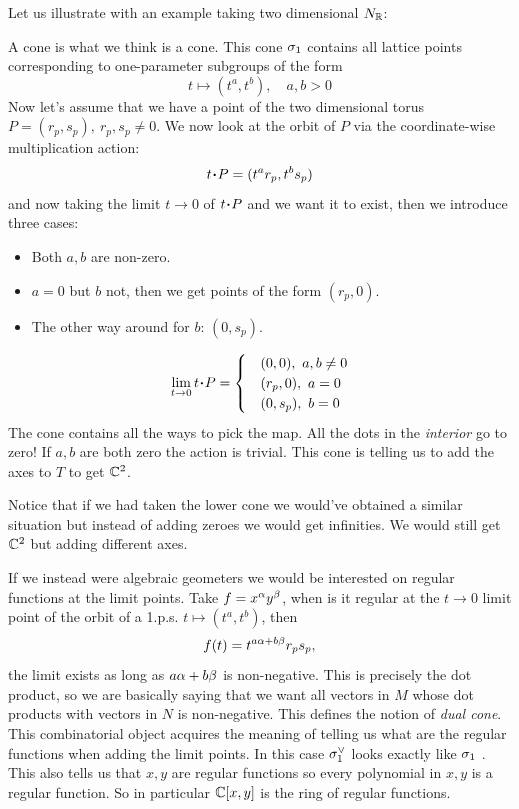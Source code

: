 \documentclass[12pt]{memoir}
\begin{document}
Let us illustrate with an example taking two dimensional $N_{\mathbb{R}}$:

\begin{Ex}
    A cone is what we think is a cone.
This cone $\sigma_1$ contains all lattice points corresponding to one-parameter subgroups of the form 
$$t\mapsto (t^a,t^b),\quad a,b>0$$
Now let's assume that we have a point of the two dimensional torus $P=(r_p,s_p),\ r_p,s_p\neq 0$. We now look at the orbit of $P$ via the coordinate-wise multiplication action:
$$t\.P=(t^ar_p,t^bs_p)$$
and now taking the limit $t\to 0$ of $t\.P$ and we want it to exist, then we introduce three cases:
\begin{itemize}
    \item Both $a,b$ are non-zero.
    \item $a=0$ but $b$ not, then we get points of the form $(r_p,0)$.
    \item The other way around for $b$: $(0,s_p)$.
\end{itemize}
$$\lim_{t\to 0}t\.P=\begin{cases}
    &(0,0),\ a,b\neq0\\
    &(r_p,0),\ a=0\\
    &(0,s_p),\ b=0
\end{cases}$$
The cone contains all the ways to pick the map. All the dots in the \emph{interior} go to zero! If $a,b$ are both zero the action is trivial. This cone is telling us to add the axes to $T$ to get $\mathbb{C}^2$.\par 
Notice that if we had taken the lower cone we would've obtained a similar situation but instead of adding zeroes we would get infinities. We would still get $\mathbb{C}^2$ but adding different axes.\par 
If we instead were algebraic geometers we would be interested on regular functions at the limit points. Take $f=x^\alpha y^\beta$, when is it regular at the $t\to 0$ limit point of the orbit of a 1.p.s. $t\mapsto (t^a,t^b)$, then 
$$f(t)=t^{a\alpha+b\beta}r_ps_p,$$
the limit exists as long as $a\alpha+b\beta$ is non-negative. This is precisely the dot product, so we are basically saying that we want all vectors in $M$ whose dot products with vectors in $N$ is non-negative. This defines the notion of \emph{dual cone}. This combinatorial object acquires the meaning of telling us what are the regular functions when adding the limit points. In this case $\sigma_1^\lor$ looks exactly like $\sigma_1$ . This also tells us that $x,y$ are regular functions so every polynomial in $x,y$ is a regular function. So in particular $\mathbb{C}[x,y]$ is the ring of regular functions. 
\end{Ex}
\end{document}
